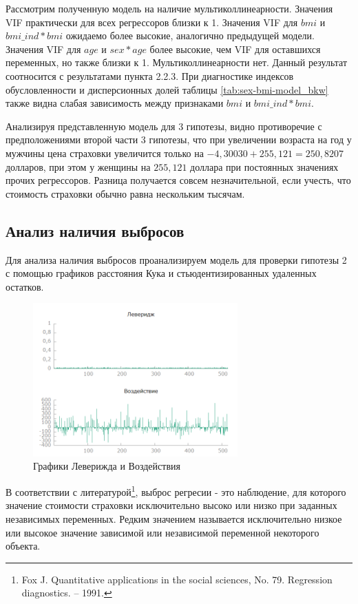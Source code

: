 \documentclass[a4paper,12pt]{article}
\begin{document}
Рассмотрим полученную модель на наличие мультиколлинеарности. Значения VIF практически для всех регрессоров близки к 1. Значения  VIF для $bmi$ и $bmi\_ind * bmi$ ожидаемо более высокие, аналогично предыдущей модели. Значения VIF для $age$ и $sex * age$ более высокие, чем VIF для оставшихся переменных, но также близки к 1. Мультиколлинеарности нет. Данный результат соотносится с результатами пункта 2.2.3. При диагностике индексов обусловленности и дисперсионных долей таблицы \ref{tab:sex-bmi-model_bkw} также видна слабая зависимость между признаками $bmi$ и $bmi\_ind * bmi$.

Анализируя представленную модель для 3 гипотезы, видно противоречие с предположениями второй части 3 гипотезы, что при увеличении возраста на год у мужчины цена страховки увеличится только на $-4,30030 + 255,121 = 250,8207$ долларов, при этом у женщины на $255,121$ доллара при постоянных значениях прочих регрессоров. Разница получается совсем незначительной, если учесть, что стоимость страховки обычно равна нескольким тысячам.

\subsection{Анализ наличия выбросов}
Для анализа наличия выбросов проанализируем модель для проверки гипотезы 2 с помощью графиков расстояния Кука и стьюдентизированных удаленных остатков.

\begin{figure}[H]
	\includegraphics[width=0.7\textwidth]{../[graphics]/lever.png}
	\centering
	\caption{Графики Леверижда и Воздействия}
	\label{fig:lever}
\end{figure}

В соответствии с литературой\footnote{%
Fox J. Quantitative applications in the social sciences, No. 79. Regression diagnostics. – 1991.}, выброс регресии - это наблюдение, для которого значение стоимости страховки исключительно высоко или низко при заданных независимых переменных. Редким значением называется исключительно низкое или высокое значение зависимой или независимой переменной некоторого объекта. 
\end{document}
